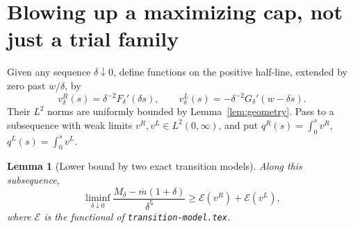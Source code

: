 \documentclass[11pt]{article}
\newtheorem{lemma}[theorem]{Lemma}
\begin{document}
\section{Blowing up a maximizing cap, not just a trial family}
Given any sequence $\delta\downarrow0$, define functions on the positive half-line, extended by zero past $w/\delta$, by
\[
 v_\delta^R(s)=\delta^{-2}F_\delta'(\delta s),\qquad
 v_\delta^L(s)=-\delta^{-2}G_\delta'(w-\delta s).
\]
Their $L^2$ norms are uniformly bounded by Lemma~\ref{lem:geometry}. Pass to a subsequence with weak limits $v^R,v^L\in L^2(0,\infty)$, and put $q^R(s)=\int_0^s v^R$, $q^L(s)=\int_0^s v^L$.

\begin{lemma}[Lower bound by two exact transition models]\label{lem:liminf}
Along this subsequence,
\[
 \liminf_{\delta\downarrow0}\frac{M_\delta-\overline m(1+\delta)}{\delta^5}
 \ge\mathscr E(v^R)+\mathscr E(v^L),
\]
where $\mathscr E$ is the functional of \texttt{transition-model.tex}.
\end{lemma}
\end{document}
